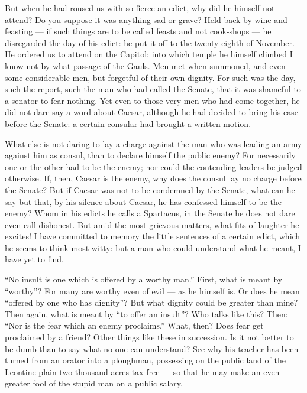  But when he had roused us with so fierce an edict, why did he himself not attend? Do you suppose it was anything sad or grave? Held back by wine and feasting --- if such things are to be called feasts and not cook-shops --- he disregarded the day of his edict: he put it off to the twenty-eighth of November. He ordered us to attend on the Capitol; into which temple he himself climbed I know not by what passage of the Gauls. Men met when summoned, and even some considerable men, but forgetful of their own dignity. For such was the day, such the report, such the man who had called the Senate, that it was shameful to a senator to fear nothing. Yet even to those very men who had come together, he did not dare say a word about Caesar, although he had decided to bring his case before the Senate: a certain consular had brought a written motion.

 What else is not daring to lay a charge against the man who was leading an army against him as consul, than to declare himself the public enemy? For necessarily one or the other had to be the enemy; nor could the contending leaders be judged otherwise. If, then, Caesar is the enemy, why does the consul lay no charge before the Senate? But if Caesar was not to be condemned by the Senate, what can he say but that, by his silence about Caesar, he has confessed himself to be the enemy? Whom in his edicts he calls a Spartacus, in the Senate he does not dare even call dishonest. But amid the most grievous matters, what fits of laughter he excites! I have committed to memory the little sentences of a certain edict, which he seems to think most witty: but a man who could understand what he meant, I have yet to find.

 ``No insult is one which is offered by a worthy man.'' First, what is meant by ``worthy''? For many are worthy even of evil --- as he himself is. Or does he mean ``offered by one who has dignity''? But what dignity could be greater than mine? Then again, what is meant by ``to offer an insult''? Who talks like this? Then: ``Nor is the fear which an enemy proclaims.'' What, then? Does fear get proclaimed by a friend? Other things like these in succession. Is it not better to be dumb than to say what no one can understand? See why his teacher has been turned from an orator into a ploughman, possessing on the public land of the Leontine plain two thousand acres tax-free --- so that he may make an even greater fool of the stupid man on a public salary.

